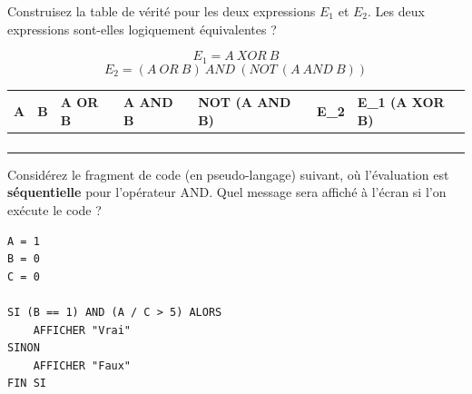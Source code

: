 \begin{Exercise}[title = Table de Vérité et Égalité]
\Question  Construisez la table de vérité pour les deux expressions $E_1$ et $E_2$. Les deux expressions sont-elles logiquement équivalentes ?

 $$E_1 = A\ XOR\ B$$
$$E_2 = (A\ OR\ B)\ AND\ (NOT\ (A\ AND\ B))$$

\begin{center}
    
\Large{
 \begin{tabular}{|l|l|l|l|l|l|l|}
    \hline
        A & B & A OR B & A AND B & NOT (A AND B) & E\_2 & E\_1 (A XOR B) \\ \hline
        & & & & & & \\ \hline
        & & & & & & \\ \hline
        & & & & & & \\ \hline
        & & & & & & \\ \hline
    \end{tabular}
}
\end{center}

\end{Exercise}

% 




\begin{Exercise}[title = Application Séquentielle]
Considérez le fragment de code (en pseudo-langage) suivant, où l'évaluation est \textbf{séquentielle} pour l'opérateur AND. Quel message sera affiché à l'écran si l'on exécute le code ?
\begin{lstlisting}
A = 1
B = 0
C = 0

SI (B == 1) AND (A / C > 5) ALORS
    AFFICHER "Vrai"
SINON
    AFFICHER "Faux"
FIN SI

\end{lstlisting}
\end{Exercise}

